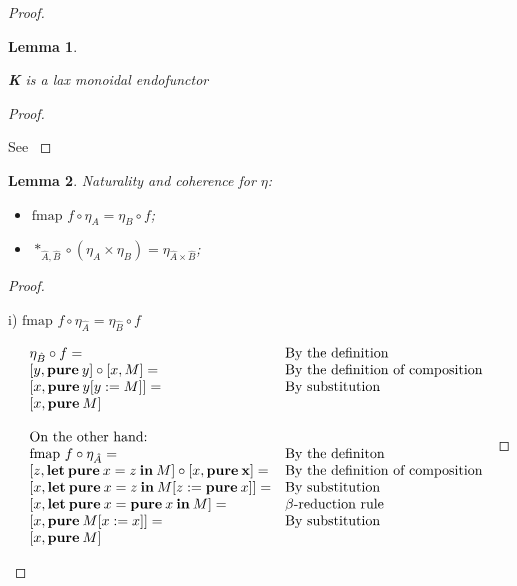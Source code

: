 \documentclass[a4paper]{article}
\newtheorem{lemma}{Lemma}
\begin{document}
\begin{proof}
\begin{lemma}
  $ $

  {\bf K} is a lax monoidal endofunctor
\end{lemma}

\begin{proof}
$ $

See \cite{ModalK}
\end{proof}

\begin{lemma} Naturality and coherence for $\eta$:

\begin{itemize}
  \item $\text{fmap } f \circ \eta_A = \eta_B \circ f$;
  \item $\ast_{\hat{A},\hat{B}} \circ (\eta_{A} \times \eta_{B}) = \eta_{\hat{A} \times \hat{B}}$;
\end{itemize}
\end{lemma}

\begin{proof}
  $ $

  i) $\text{fmap } f \circ \eta_{\hat{A}} = \eta_{\hat{B}} \circ f$

\vspace{\baselineskip}

$\begin{array}{lll}
&\eta_{\hat{B}} \circ f = & \text{By the definition} \\
&[y, {\bf pure \:} y] \circ [x, M] = & \text{By the definition of composition}\\
&[x, {\bf pure \:} y [y := M]] = & \text{By substitution}\\
&[x, {\bf pure \:} M]& \\
& &\\
&\text{On the other hand:}& \\
&\text{fmap } f \circ \eta_{\hat{A}} = & \text{By the definiton} \\
&[z, {\bf let \: pure \:} x = z {\: \bf in \:} M] \circ [x, {\bf pure \: x}] = & \text{By the definition of composition}\\
&[x, {\bf let \: pure \:} x = z {\: \bf in \:} M [z := {\bf pure \:} x]] = & \text{By substitution} \\
&[x, {\bf let \: pure \:} x = {\bf pure \:} x {\: \bf in \:} M] = & \text{$\beta$-reduction rule}\\
&[x, {\bf pure \:} M [x := x]] = & \text{By substitution}\\
&[x, {\bf pure \:} M]&
\end{array}$


\end{proof}
\end{proof}
\end{document}
